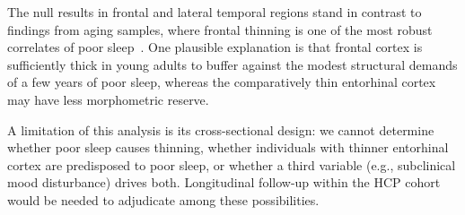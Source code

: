 The null results in frontal and lateral temporal regions stand in contrast to findings from aging samples, where frontal thinning is one of the most robust correlates of poor sleep~\cite{branger2016relationships}.
One plausible explanation is that frontal cortex is sufficiently thick in young adults to buffer against the modest structural demands of a few years of poor sleep, whereas the comparatively thin entorhinal cortex may have less morphometric reserve.

A limitation of this analysis is its cross-sectional design: we cannot determine whether poor sleep causes thinning, whether individuals with thinner entorhinal cortex are predisposed to poor sleep, or whether a third variable (e.g., subclinical mood disturbance) drives both.
Longitudinal follow-up within the HCP cohort would be needed to adjudicate among these possibilities.
